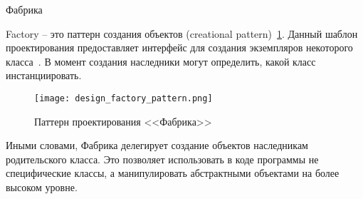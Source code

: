 \subsubsection{}Фабрика
\

Factory -- это паттерн создания объектов (creational pattern)~\ref{sec:modeling:factory}. Данный шаблон проектирования предоставляет интерфейс для создания экземпляров некоторого класса~\cite{design_patterns}. В момент создания наследники могут определить, какой класс инстанциировать.

\begin{figure}[ht]
\centering
    \texttt{[image: design\_factory\_pattern.png]}
    \caption{Паттерн проектирования <<Фабрика>>}
    \label{sec:modeling:factory}
\end{figure}

Иными словами, Фабрика делегирует создание объектов наследникам родительского класса. Это позволяет использовать в коде программы не специфические классы, а манипулировать абстрактными объектами на более высоком уровне.